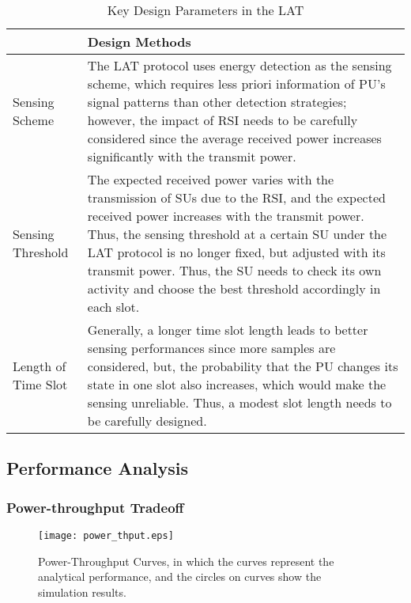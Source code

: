 \documentclass[onecolumn,12pt]{IEEEtran}
\begin{document}
\begin{table}[t]
\renewcommand{\arraystretch}{1.2}
\caption{Key Design Parameters in the LAT} \label{KPD}
\centering
\begin{tabular}{|p{3cm}|p{13cm}|}
\hline
\centering{\textbf{Key Parameters}} & {\textbf{Design Methods}} \\ \hline
Sensing Scheme & The LAT protocol uses energy detection as the sensing scheme, which requires less priori information of PU's signal patterns than other detection strategies\footnotemark; however, the impact of RSI needs to be carefully considered since the average received power increases significantly with the transmit power.\\ \hline
Sensing Threshold &  The expected received power varies with the transmission of SUs due to the RSI, and the expected received power increases with the transmit power. Thus, the sensing threshold at a certain SU under the LAT protocol is no longer fixed, but adjusted with its transmit power. Thus, the SU needs to check its own activity and choose the best threshold accordingly in each slot.\\ \hline
Length of Time Slot& Generally, a longer time slot length leads to better sensing performances since more samples are considered, but, the probability that the PU changes its state in one slot also increases, which would make the sensing unreliable. Thus, a modest slot length needs to be carefully designed.  \\ \hline
\end{tabular}
\end{table}



\subsection{Performance Analysis}
\subsubsection{Power-throughput Tradeoff}

\begin{figure}[ht]
\centering
\texttt{[image: power\_thput.eps]}
\caption{Power-Throughput Curves, in which the curves represent the analytical performance, and the circles on curves show the simulation results.} \label{power_thput}
\end{figure}
\end{document}
